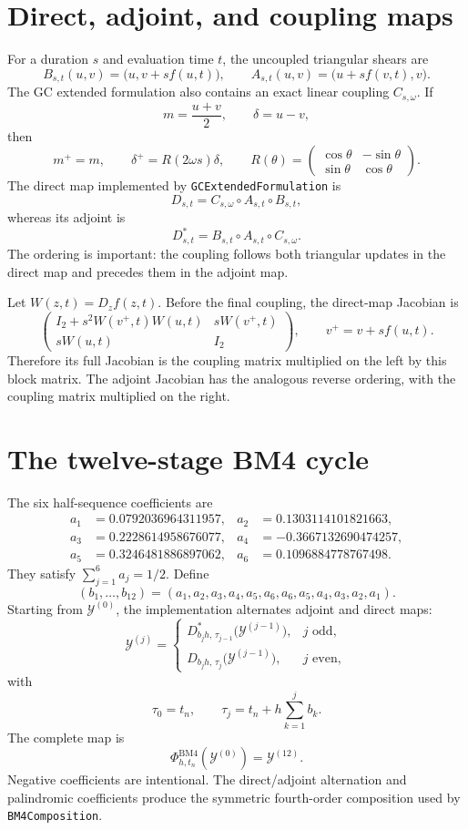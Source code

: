 \documentclass[11pt,a4paper]{article}
\newcommand{\Id}{I}
\newcommand{\Y}{\mathcal{Y}}
\newcommand{\PhiBM}{\Phi^{\mathrm{BM4}}_{h,t_n}}
\begin{document}
\section{Direct, adjoint, and coupling maps}

For a duration $s$ and evaluation time $t$, the uncoupled triangular shears are
\[
 B_{s,t}(u,v)=\bigl(u,v+s f(u,t)\bigr),
 \qquad
 A_{s,t}(u,v)=\bigl(u+s f(v,t),v\bigr).
\]
The GC extended formulation also contains an exact linear coupling
$C_{s,\omega}$.  If
\[
 m=\frac{u+v}{2},
 \qquad
 \delta=u-v,
\]
then
\[
 m^+=m,
 \qquad
 \delta^+=R(2\omega s)\delta,
 \qquad
 R(\theta)=
 \begin{pmatrix}
  \cos\theta&-\sin\theta\\
  \sin\theta&\cos\theta
 \end{pmatrix}.
\]
The direct map implemented by \texttt{GCExtendedFormulation} is
\[
 D_{s,t}=C_{s,\omega}\circ A_{s,t}\circ B_{s,t},
\]
whereas its adjoint is
\[
 D^*_{s,t}=B_{s,t}\circ A_{s,t}\circ C_{s,\omega}.
\]
The ordering is important: the coupling follows both triangular updates in the
direct map and precedes them in the adjoint map.

Let $W(z,t)=D_zf(z,t)$.  Before the final coupling, the direct-map Jacobian is
\[
 \begin{pmatrix}
  \Id_2+s^2W(v^+,t)W(u,t)&sW(v^+,t)\\
  sW(u,t)&\Id_2
 \end{pmatrix},
 \qquad
 v^+=v+s f(u,t).
\]
Therefore its full Jacobian is the coupling matrix multiplied on the left by
this block matrix.  The adjoint Jacobian has the analogous reverse ordering,
with the coupling matrix multiplied on the right.

\section{The twelve-stage BM4 cycle}

The six half-sequence coefficients are
\[
\begin{aligned}
 a_1&= 0.0792036964311957,&
 a_2&= 0.1303114101821663,\\
 a_3&= 0.2228614958676077,&
 a_4&=-0.3667132690474257,\\
 a_5&= 0.3246481886897062,&
 a_6&= 0.1096884778767498.
\end{aligned}
\]
They satisfy $\sum_{j=1}^6 a_j=1/2$.  Define
\[
 (b_1,\ldots,b_{12})
 =(a_1,a_2,a_3,a_4,a_5,a_6,a_6,a_5,a_4,a_3,a_2,a_1).
\]
Starting from $\Y^{(0)}$, the implementation alternates adjoint and direct
maps:
\[
 \Y^{(j)}=
 \begin{cases}
  D^*_{b_jh,\,\tau_{j-1}}\bigl(\Y^{(j-1)}\bigr),&j\text{ odd},\\
  D_{b_jh,\,\tau_j}\bigl(\Y^{(j-1)}\bigr),&j\text{ even},
 \end{cases}
\]
with
\[
 \tau_0=t_n,
 \qquad
 \tau_j=t_n+h\sum_{k=1}^j b_k.
\]
The complete map is
\[
 \boxed{\PhiBM(\Y^{(0)})=\Y^{(12)}.}
\]
Negative coefficients are intentional.  The direct/adjoint alternation and
palindromic coefficients produce the symmetric fourth-order composition used by
\texttt{BM4Composition}.
\end{document}
